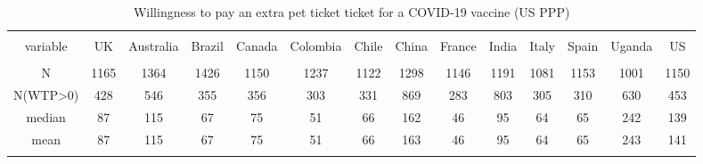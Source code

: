
\begin{table}[!htbp] \centering 
  \caption{Willingness to pay an extra pet ticket ticket for a COVID-19 vaccine (US PPP)} 
  \label{} 
\begin{tabular}{@{\extracolsep{5pt}} cccccccccccccc} 
\\[-1.8ex]\hline 
\hline \\[-1.8ex] 
variable & UK & Australia & Brazil & Canada & Colombia & Chile & China & France & India & Italy & Spain & Uganda & US \\ 
\hline \\[-1.8ex] 
N & 1165 & 1364 & 1426 & 1150 & 1237 & 1122 & 1298 & 1146 & 1191 & 1081 & 1153 & 1001 & 1150 \\ 
N(WTP\textgreater 0) & 428 & 546 & 355 & 356 & 303 & 331 & 869 & 283 & 803 & 305 & 310 & 630 & 453 \\ 
median & 87 & 115 & 67 & 75 & 51 & 66 & 162 & 46 & 95 & 64 & 65 & 242 & 139 \\ 
mean & 87 & 115 & 67 & 75 & 51 & 66 & 163 & 46 & 95 & 64 & 65 & 243 & 141 \\ 
\hline \\[-1.8ex] 
\end{tabular} 
\end{table} 
